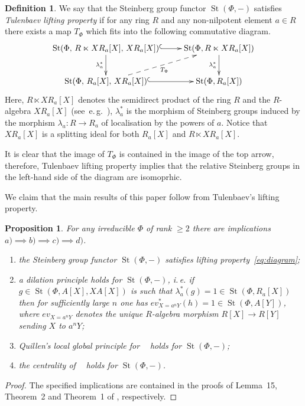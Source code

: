 \documentclass[11pt]{amsart}
\theoremstyle{plain} \declaretheorem[name=Theorem, Refname={Theorem,Theorems}]{tm} \Crefname{tm}{Theorem}{Theorems}
\numberwithin{equation}{section}
\newtheorem{prop}[lm]{Proposition} \Crefname{prop}{Proposition}{Propositions}
\theoremstyle{definition} \newtheorem{df}[lm]{Definition} \Crefname{df}{Definition}{Definitions}
\theoremstyle{remark} \newtheorem{rk}[lm]{Remark} \Crefname{rk}{Remark}{Remarks}
\newcommand{\St}{\mathop{\mathrm{St}}\nolimits}
\newcommand{\Kt}{\mathop{\mathrm{K_2}}\nolimits}
\begin{document}
\begin{df} \label{df:tlp}
We say that the Steinberg group functor $\St(\Phi, -)$ satisfies {\it Tulenbaev lifting property} if for any ring $R$ and any non-nilpotent element $a \in R$
there exists a map $T_\Phi$ which fits into the following commutative diagram.
\setcounter{equation}{1}
\begin{equation} \xymatrix{\St(\Phi,\,R\ltimes XR_a[X],\,XR_a[X]) \ar@{^{(}->}[r] \ar[d]_-{\lambda_a^*} & \St(\Phi, R \ltimes XR_a[X]) \ar[d]_-{\lambda_a^*} \\
                           \St(\Phi,\,R_a[X],\,XR_a[X]) \ar@{-->}[ru]_-{T_\Phi} \ar@{^{(}->}[r] & \St(\Phi, R_a[X])} \label{eq:diagram} \end{equation}
Here, $R\ltimes XR_a[X]$ denotes the semidirect product of the ring $R$ and the $R$-algebra $XR_a[X]$ (see~e.\,g.~\cite[Definition~3.2]{SCh}), $\lambda_a^*$ is the morphism of Steinberg groups induced by the morphism $\lambda_a\colon R \to R_a$ of localisation by the powers of $a$.                           
Notice that $XR_a[X]$ is a splitting ideal for both $R_a[X]$ and $R \ltimes XR_a[X]$.
\end{df}
It is clear that the image of $T_\Phi$ is contained in the image of the top arrow, therefore, Tulenbaev lifting property implies that the relative Steinberg groups in the left-hand side of the diagram are isomoprhic.

We claim that the main results of this paper follow from Tulenbaev's lifting property.
\begin{prop} For any irreducible $\Phi$ of rank $\geq 2$ there are implications $a) \implies b) \implies c) \implies d)$.
\begin{enumerate}
 \item the Steinberg group functor $\St(\Phi, -)$ satisfies lifting property~\eqref{eq:diagram};
 \item a dilation principle holds for $\St(\Phi, -)$, i.\,e. if $g\in\St(\Phi, A[X], XA[X])$ is such that $\lambda_a^*(g) = 1 \in \St(\Phi, R_a[X])$ then
       for sufficiently large $n$ one has $ev_{X = a^n Y}^*(h) = 1 \in \St(\Phi, A[Y])$, where $ev_{X=a^n Y}$ denotes the unique $R$-algebra morphism $R[X]\to R[Y]$ sending $X$ to $a^nY$;
 \item Quillen's local global principle for $\Kt$ holds for $\St(\Phi, -)$;
 \item the centrality of $\Kt$ holds for $\St(\Phi, -)$.
\end{enumerate} \end{prop}
\begin{proof} The specified implications are contained in the proofs of Lemma~15, Theorem~2 and Theorem~1 of \cite{SCh}, respectively. \end{proof}
     
\end{document}
